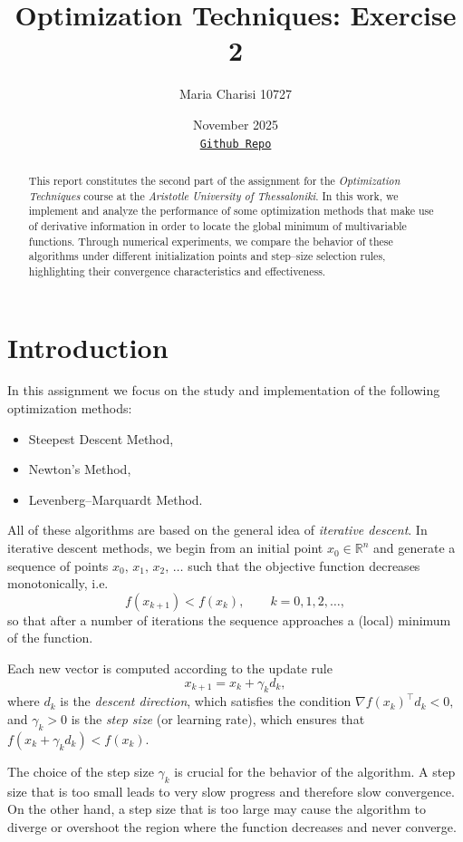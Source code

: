 \documentclass[11pt]{article}
\title{Optimization Techniques: Exercise 2}
\author{Maria Charisi 10727}
\date{November 2025\\ 
\href{https://github.com/mariaxarisi/Optimization-Techniques}{\texttt{Github Repo}}}
\begin{document}
\maketitle

\begin{abstract}
This report constitutes the second part of the assignment for the \textit{Optimization Techniques} course at the \textit{Aristotle University of Thessaloniki}. 
In this work, we implement and analyze the performance of some optimization methods that make use of derivative information in order to locate the global minimum of multivariable functions. 
Through numerical experiments, we compare the behavior of these algorithms under different initialization points and step–size selection rules, highlighting their convergence characteristics and effectiveness.
\end{abstract}


\tableofcontents
\newpage

\section{Introduction}

In this assignment we focus on the study and implementation of the following optimization methods:
\begin{itemize}
    \item Steepest Descent Method,
    \item Newton's Method,
    \item Levenberg--Marquardt Method.
\end{itemize}

All of these algorithms are based on the general idea of \textit{iterative descent}.  
In iterative descent methods, we begin from an initial point $x_0 \in \mathbb{R}^n$ and generate a sequence of points
\(
x_0,\, x_1,\, x_2,\, \ldots
\)
such that the objective function decreases monotonically, i.e.
\[
f(x_{k+1}) < f(x_k), \qquad k = 0,1,2,\ldots,
\]
so that after a number of iterations the sequence approaches a (local) minimum of the function.

Each new vector is computed according to the update rule
\[
x_{k+1} = x_k + \gamma_k d_k,
\]
where $d_k$ is the \textit{descent direction}, which satisfies the condition
\(
\nabla f(x_k)^\top d_k < 0,
\)
and $\gamma_k>0$ is the \textit{step size} (or learning rate), which ensures that
\(
f(x_k + \gamma_k d_k) < f(x_k).
\)

The choice of the step size $\gamma_k$ is crucial for the behavior of the algorithm.  
A step size that is too small leads to very slow progress and therefore slow convergence.  
On the other hand, a step size that is too large may cause the algorithm to diverge or overshoot the region where the function decreases and never converge.
\end{document}
